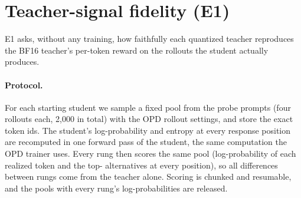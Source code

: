 \section{Teacher-signal fidelity (E1)}\label{sec:fidelity}

E1 asks, without any training, how faithfully each quantized teacher reproduces the BF16
teacher's per-token reward on the rollouts the student actually produces.

\paragraph{Protocol.} For each starting student we sample a fixed pool from the \nProbe{}
probe prompts (four rollouts each, 2{,}000 in total) with the OPD rollout settings, and store the
exact token ids. The student's log-probability and entropy at every response position are
recomputed in one forward pass of the student, the same computation the OPD trainer uses. Every
rung then scores the same pool (log-probability of each realized token and the
top-\teacherTopK{} alternatives at every position), so all differences between rungs come from
the teacher alone. Scoring is chunked and resumable, and the pools with every rung's
log-probabilities are released.


